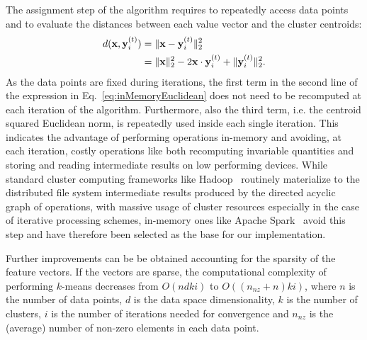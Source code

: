 The assignment step of the algorithm requires to repeatedly access data points and to evaluate the distances between each value vector and the cluster centroids:
\begin{equation}
	\label{eq:inMemoryEuclidean}
	\begin{aligned}
d({\bf{x}},{\bf{y}}_i^{\left( t \right)}) &= \| {{\bf{x}} - {\bf{y}}_i^{\left( t \right)}} \|_2^2 \\
																						 &= \| {\bf{x}} \|_2^2 - 2{\bf{x}} \cdot {\bf{y}}_i^{(t)} + \| {{\bf{y}}_i^{\left( t \right)}} \|_2^2 \text{.}
	\end{aligned}
\end{equation}
As the data points are fixed during iterations, the first term in the second line of the expression in Eq.~\ref{eq:inMemoryEuclidean} does not need to be recomputed at each iteration of the algorithm. 
Furthermore, also the third term, i.e. the centroid squared Euclidean norm, is repeatedly used inside each single iteration. 
This indicates the advantage of performing operations in-memory and avoiding, at each iteration, costly operations like both recomputing invariable quantities and storing and reading intermediate results on low performing devices. 
While standard cluster computing frameworks like Hadoop~\cite{white2009hadoop} routinely materialize to the distributed file system intermediate results produced by the directed acyclic graph of operations, with massive usage of cluster resources especially in the case of iterative processing schemes, in-memory ones like Apache Spark~\cite{zaharia2010spark, zaharia2012resilient} avoid this step and have therefore been selected as the base for our implementation.

Further improvements can be be obtained accounting for the sparsity of the feature vectors.
If the vectors are sparse, the computational complexity of performing \mbox{$k$-means} decreases from $O(ndki)$ to $O((n_{nz}+n)ki)$, where $n$ is the number of data points, $d$ is the data space dimensionality, $k$ is the number of clusters, $i$ is the number of iterations needed for convergence and $n_{nz}$ is the (average) number of non-zero elements in each data point.























